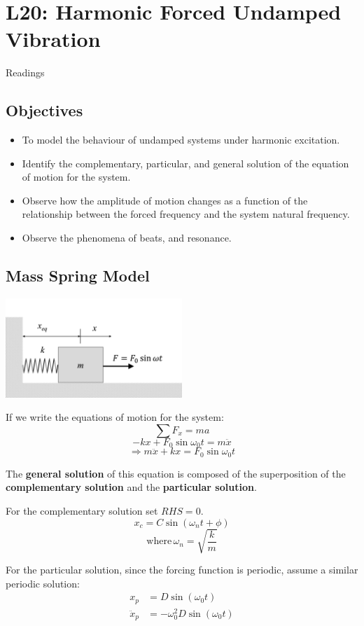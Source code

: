 \documentclass[12pt,letterpaper,twoside]{report}
\begin{document}
\vspace*{6\baselineskip}

\chapter{L20: Harmonic Forced Undamped Vibration}
Readings

\section{Objectives}
\begin{itemize}
\item To model the behaviour of undamped systems under harmonic excitation. 
\item Identify the complementary, particular, and general solution of the equation of motion for the system.
\item Observe how the amplitude of motion changes as a function of the relationship between the forced frequency and the system natural frequency.  
\item Observe the phenomena of beats, and resonance. 
\end{itemize}

\section{Mass Spring Model}
\includegraphics[trim={1cm 1cm 2cm 4cm},clip,width=0.5\textwidth, left]{Slide82}

If we write the equations of motion for the system:
\[
\sum F_x = ma
\]
\[
-kx + F_0 \sin \omega_0 t = m \ddot{x}
\]
\[
\Rightarrow m \ddot{x} + kx = F_0 \sin \omega_0t
\]

The \textbf{general solution} of this equation is composed of the superposition of the \textbf{complementary solution} and the \textbf{particular solution}.  

For the complementary solution set $RHS = 0$.
\[ 
x_c = C \sin (\omega_n t + \phi)
\]
\[ \text{where} \, \omega_n = \sqrt{\frac{k}{m}}
\]

For the particular solution, since the forcing function is periodic, assume a similar periodic solution:
\begin{align*}
x_p &= D \sin (\omega_0 t)\\
\ddot{x}_p &= -\omega_0^2 D \sin (\omega_0 t)\\
\end{align*}
\end{document}
